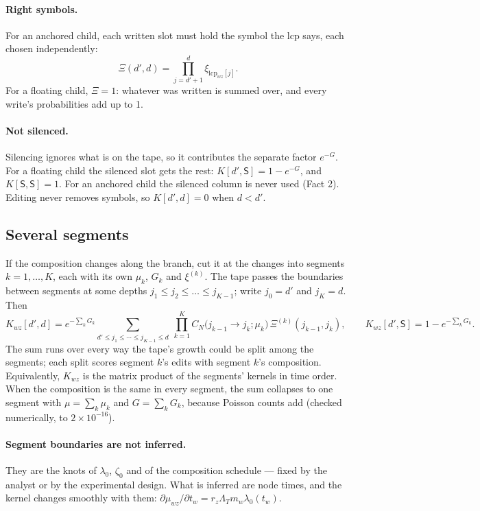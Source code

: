 \documentclass[11pt]{article}
\newcommand{\Sil}{\mathsf{S}}               %
\newcommand{\LamT}{\Lambda_T}
\newcommand{\lcp}{\mathrm{lcp}}
\begin{document}
\paragraph{Right symbols.} For an anchored child, each written slot must hold the symbol the lcp
says, each chosen independently:
\begin{equation}
\Xi(d',d)=\prod_{j=d'+1}^{d}\xi_{\lcp_{wz}[j]} .
\end{equation}
For a floating child, $\Xi=1$: whatever was written is summed over, and every write's probabilities
add up to 1.

\paragraph{Not silenced.} Silencing ignores what is on the tape, so it contributes the separate
factor $e^{-G}$. For a floating child the silenced slot gets the rest:
$K[d',\Sil]=1-e^{-G}$, and $K[\Sil,\Sil]=1$. For an anchored child the silenced column is never used
(Fact 2). Editing never removes symbols, so $K[d',d]=0$ when $d<d'$.

\subsection{Several segments}

If the composition changes along the branch, cut it at the changes into segments $k=1,\dots,K$, each
with its own $\mu_k$, $G_k$ and $\xi^{(k)}$. The tape passes the boundaries between segments at some
depths $j_1\le j_2\le\dots\le j_{K-1}$; write $j_0=d'$ and $j_K=d$. Then
\begin{equation}
K_{wz}[d',d]=e^{-\sum_kG_k}\sum_{d'\le j_1\le\cdots\le j_{K-1}\le d}\ \prod_{k=1}^{K}
C_N\big(j_{k-1}\to j_k;\mu_k\big)\,\Xi^{(k)}(j_{k-1},j_k),
\qquad K_{wz}[d',\Sil]=1-e^{-\sum_kG_k}.
\label{eq:multiseg}
\end{equation}
The sum runs over every way the tape's growth could be split among the segments; each split scores
segment $k$'s edits with segment $k$'s composition. Equivalently, $K_{wz}$ is the matrix product of
the segments' kernels in time order. When the composition is the same in every segment, the sum
collapses to one segment with $\mu=\sum_k\mu_k$ and $G=\sum_kG_k$, because Poisson counts add
(checked numerically, to $2\times10^{-16}$).

\paragraph{Segment boundaries are not inferred.} They are the knots of $\lambda_0$, $\zeta_0$ and of
the composition schedule --- fixed by the analyst or by the experimental design. What is inferred are
node times, and the kernel changes smoothly with them:
$\partial\mu_{wz}/\partial t_w=r_z\LamT m_w\lambda_0(t_w)$.
\end{document}
